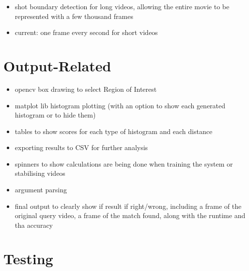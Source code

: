 \begin{itemize}
    \item shot boundary detection for long videos, allowing the entire movie to be represented with a few thousand frames
    \item current: one frame every second for short videos
\end{itemize}


\section{Output-Related}

\begin{itemize}
    \item opencv box drawing to select Region of Interest
    \item matplot lib histogram plotting (with an option to show each generated histogram or to hide them)
    \item tables to show scores for each type of histogram and each distance
    \item exporting results to CSV for further analysis
    \item spinners to show calculations are being done when training the system or stabilising videos 
    \item argument parsing
    \item final output to clearly show if result if right/wrong, including a frame of the original query video, a frame of the match found, along with the runtime and tha accuracy
\end{itemize}


\section{Testing}

